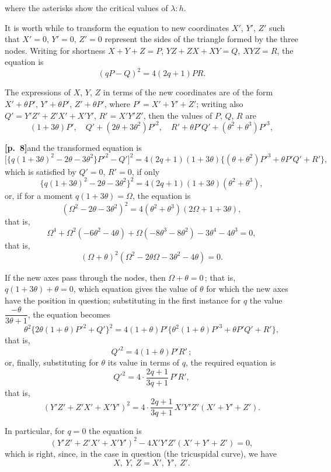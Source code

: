 \documentclass[11pt,a4paper]{article}
\begin{document}
\medskip

\noindent where the asterisks show the critical values of $\lambda : h$.

\medskip

It is worth while to transform the equation to new coordinates $X'$, $Y'$, $Z'$ such that $X' = 0$, $Y' = 0$, $Z' = 0$ represent the sides of the triangle formed by the three nodes. Writing for shortness $X + Y + Z = P$, $YZ + ZX + XY = Q$, $XYZ = R$, the equation is
\[
(qP - Q)^{2} = 4(2q + 1) PR.
\]

The expressions of $X$, $Y$, $Z$ in terms of the new coordinates are of the form $X' + \theta P'$, $Y' + \theta P'$, $Z' + \theta P'$, where $P' = X' + Y' + Z'$; writing also $Q' = Y'Z' + Z'X' + X'Y'$, $R' = X'Y'Z'$, then the values of $P$, $Q$, $R$ are
\[
(1 + 3\theta) P', \quad Q' + (2\theta + 3\theta^{2}) P'^{2}, \quad R' + \theta P' Q' + (\theta^{2} + \theta^{3}) P'^{3},
\]

\noindent\textbf{[p.~8]}\quad and the transformed equation is
\[
\bigl[\{q(1 + 3\theta)^{2} - 2\theta - 3\theta^{2}\} P'^{2} - Q' \bigr]^{2}
= 4(2q + 1)(1 + 3\theta) \{(\theta + \theta^{2}) P'^{3} + \theta P' Q' + R'\},
\]
which is satisfied by $Q' = 0$, $R' = 0$, if only
\[
\{q(1 + 3\theta)^{2} - 2\theta - 3\theta^{2}\}^{2} = 4(2q + 1)(1 + 3\theta)(\theta^{2} + \theta^{3}),
\]
or, if for a moment $q(1 + 3\theta) = \Omega$, the equation is
\[
(\Omega^{2} - 2\theta - 3\theta^{2})^{2} = 4(\theta^{2} + \theta^{3})(2\Omega + 1 + 3\theta),
\]
that is,
\[
\Omega^{4} + \Omega^{2}(-6\theta^{2} - 4\theta) + \Omega(-8\theta^{3} - 8\theta^{2}) - 3\theta^{4} - 4\theta^{3} = 0,
\]
that is,
\[
(\Omega + \theta)^{2} (\Omega^{2} - 2\theta\Omega - 3\theta^{2} - 4\theta) = 0.
\]

If the new axes pass through the nodes, then $\Omega + \theta = 0$\,; that is, $q(1 + 3\theta) + \theta = 0$, which equation gives the value of $\theta$ for which the new axes have the position in question; substituting in the first instance for $q$ the value $\dfrac{-\theta}{3\theta + 1}$, the equation becomes
\[
\theta^{2} \{2\theta(1 + \theta)P'^{2} + Q'\}^{2} = 4(1 + \theta) P'\{\theta^{2}(1 + \theta) P'^{3} + \theta P' Q' + R'\},
\]
that is,
\[
Q'^{2} = 4(1 + \theta) P' R'\,;
\]
or, finally, substituting for $\theta$ its value in terms of $q$, the required equation is
\[
Q'^{2} = 4 \cdot \frac{2q + 1}{3q + 1}\, P' R',
\]
that is,
\[
(Y'Z' + Z'X' + X'Y')^{2} = 4 \cdot \frac{2q + 1}{3q + 1}\, X'Y'Z'(X' + Y' + Z').
\]

In particular, for $q = 0$ the equation is
\[
(Y'Z' + Z'X' + X'Y')^{2} - 4 X'Y'Z'(X' + Y' + Z') = 0,
\]
which is right, since, in the case in question (the tricuspidal curve), we have
\[
X,\ Y,\ Z = X',\ Y',\ Z'.
\]
\end{document}

